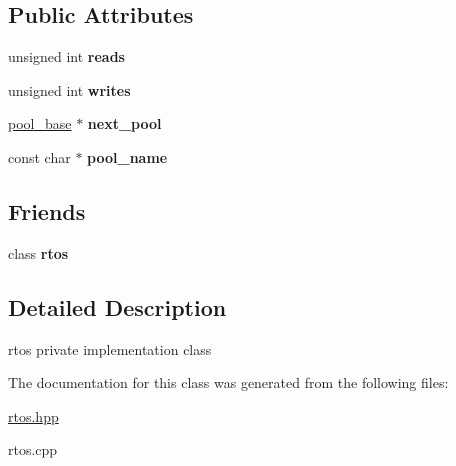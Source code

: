 \subsection*{Public Attributes}
\begin{DoxyCompactItemize}
\item 
unsigned int {\bfseries reads}\hypertarget{classrtos_1_1pool__base_af1d2c0ebc43cdf86eb369d8e181fc2c7}{}\label{classrtos_1_1pool__base_af1d2c0ebc43cdf86eb369d8e181fc2c7}

\item 
unsigned int {\bfseries writes}\hypertarget{classrtos_1_1pool__base_a85103a528d8dac5e40262cc39968a7f6}{}\label{classrtos_1_1pool__base_a85103a528d8dac5e40262cc39968a7f6}

\item 
\hyperlink{classrtos_1_1pool__base}{pool\+\_\+base} $\ast$ {\bfseries next\+\_\+pool}\hypertarget{classrtos_1_1pool__base_a123094ff55fa3f599059a6133168f7cc}{}\label{classrtos_1_1pool__base_a123094ff55fa3f599059a6133168f7cc}

\item 
const char $\ast$ {\bfseries pool\+\_\+name}\hypertarget{classrtos_1_1pool__base_aa546f6f4b86abc5878edaaaf4560ef70}{}\label{classrtos_1_1pool__base_aa546f6f4b86abc5878edaaaf4560ef70}

\end{DoxyCompactItemize}
\subsection*{Friends}
\begin{DoxyCompactItemize}
\item 
class {\bfseries rtos}\hypertarget{classrtos_1_1pool__base_a2a7bcfc34141352757ad672e3ecd099f}{}\label{classrtos_1_1pool__base_a2a7bcfc34141352757ad672e3ecd099f}

\end{DoxyCompactItemize}


\subsection{Detailed Description}
rtos private implementation class 

The documentation for this class was generated from the following files\+:\begin{DoxyCompactItemize}
\item 
\hyperlink{rtos_8hpp}{rtos.\+hpp}\item 
rtos.\+cpp\end{DoxyCompactItemize}
